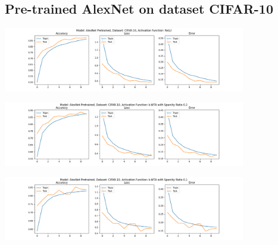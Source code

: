 \documentclass[a4paper]{article}
\begin{document}
		\subsection{Pre-trained AlexNet on dataset CIFAR-10}
			\begin{center}
				\centering
				\includegraphics[width=400px,keepaspectratio]{Results/AlexNet_CIFAR-10_ReLU_Pretrained.png}
			\end{center}
			\begin{center}
				\centering
				\includegraphics[width=400px,keepaspectratio]{Results/AlexNet_CIFAR-10_k-WTA_0.2_Pretrained.png}
			\end{center}
			\begin{center}
				\centering
				\includegraphics[width=400px,keepaspectratio]{Results/AlexNet_CIFAR-10_k-WTA_0.1_Pretrained.png}
			\end{center}
		
\end{document}
